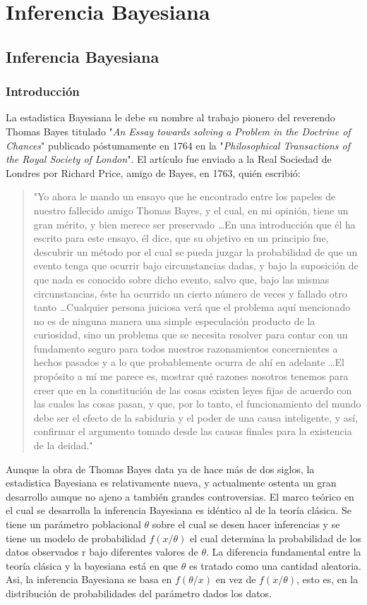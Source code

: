 \part{Inferencia Bayesiana}

\chapter{Inferencia Bayesiana}

\section{Introducción}
\noindent La estadistica Bayesiana le debe su nombre al trabajo pionero del reverendo Thomas Bayes titulado "\textit{An Essay towards solving a Problem in the Doctrine of Chances}" publicado póstumamente en 1764 en la "\textit{Philosophical Transactions of the Royal Society of London}". El artículo fue enviado a la Real Sociedad de Londres por Richard Price, amigo de Bayes, en 1763, quién escribió:
\blockquote{"Yo ahora le mando un ensayo que he encontrado entre los papeles de nuestro fallecido amigo Thomas Bayes, y el cual, en mi opinión, tiene un gran mérito, y bien merece ser preservado \ldots En una introducción que él ha escrito para este ensayo, él dice, que su objetivo en un principio fue, descubrir un método por el cual se pueda juzgar la probabilidad de que un evento tenga que ocurrir bajo circunstancias dadas, y bajo la suposición de que nada es conocido sobre dicho evento, salvo que, bajo las mismas circunstancias, éste ha ocurrido un cierto número de veces y fallado otro tanto \ldots Cualquier persona juiciosa verá que el problema aquí mencionado no es de ninguna manera una simple especulación producto de la curiosidad, sino un problema que se necesita resolver para contar con un fundamento seguro para todos nuestros razonamientos concernientes a hechos pasados y a lo que probablemente ocurra de ahí en adelante \ldots El propósito a mí me parece es, mostrar qué razones nosotros tenemos para creer que en la constitución de las cosas existen leyes fijas de acuerdo con las cuales las cosas pasan, y que, por lo tanto, el funcionamiento del mundo debe ser el efecto de la sabiduria y el poder de una causa inteligente, y así, confirmar el argumento tomado desde las causas finales para la existencia de la deidad."}
Aunque la obra de Thomas Bayes data ya de hace más de dos siglos, la estadistica Bayesiana es relativamente nueva, y actualmente ostenta un gran desarrollo aunque no ajeno a también grandes controversias. El marco teórico en el cual se desarrolla la inferencia Bayesiana es idéntico al de la teoría clásica. Se tiene un parámetro poblacional $\theta$ sobre el cual se desen hacer inferencias y se tiene un modelo de probabilidad $f(x/\theta)$ el cual determina la probabilidad de los datos observados r bajo diferentes valores de $\theta$. La diferencia fundamental entre la teoría clásica y la bayesiana está en que $\theta$ es tratado como una cantidad aleatoria. Asi, la inferencia Bayesiana se basa en $f(\theta / x)$ en vez de $f(x/ \theta)$, esto es, en la distribución de probabilidades del parámetro dados los datos.
